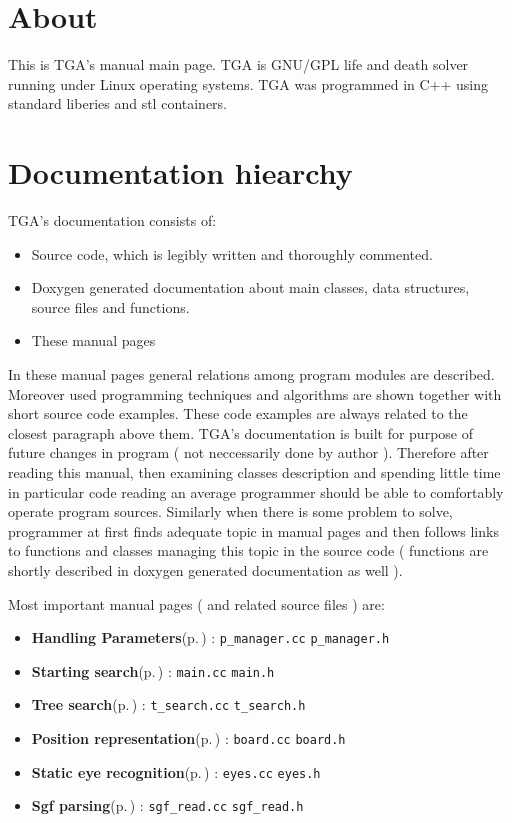 \section{About}\label{index_About}
This is TGA's manual main page. TGA is GNU/GPL life and death solver running under Linux operating systems. TGA was programmed in C++ using standard liberies and stl containers. \section{Documentation hiearchy}\label{index_mainpage__sec_1}
TGA's documentation consists of:\begin{itemize}
\item Source code, which is legibly written and thoroughly commented.\item Doxygen generated documentation about main classes, data structures, source files and functions.\item These manual pages\end{itemize}


In these manual pages general relations among program modules are described. Moreover used programming techniques and algorithms are shown together with short source code examples. These code examples are always related to the closest paragraph above them. TGA's documentation is built for purpose of future changes in program ( not neccessarily done by author ). Therefore after reading this manual, then examining classes description and spending little time in particular code reading an average programmer should be able to comfortably operate program sources. Similarly when there is some problem to solve, programmer at first finds adequate topic in manual pages and then follows links to functions and classes managing this topic in the source code ( functions are shortly described in doxygen generated documentation as well ).

Most important manual pages ( and related source files ) are:\begin{itemize}
\item {\bf Handling Parameters}{\rm (p.\,\pageref{page_1})} : {\tt p\_\-manager.cc} {\tt p\_\-manager.h} \item {\bf Starting search}{\rm (p.\,\pageref{page_2})} : {\tt main.cc} {\tt main.h} \item {\bf Tree search}{\rm (p.\,\pageref{page_3})} : {\tt t\_\-search.cc} {\tt t\_\-search.h} \item {\bf Position representation}{\rm (p.\,\pageref{page_6})} : {\tt board.cc} {\tt board.h} \item {\bf Static eye recognition}{\rm (p.\,\pageref{page_4})} : {\tt eyes.cc} {\tt eyes.h} \item {\bf Sgf parsing}{\rm (p.\,\pageref{page_5})} : {\tt sgf\_\-read.cc} {\tt sgf\_\-read.h} \end{itemize}
